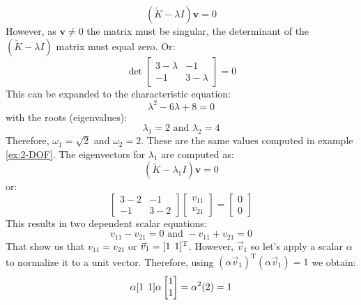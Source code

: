\documentclass[12pt,letter]{article}
\begin{document}
\begin{example}
	\begin{equation}
	(\widetilde{K} - \lambda I)\textbf{v} =  0
	\end{equation}
	However, as $\textbf{v} \neq 0$ the matrix must be singular, the determinant of the $(\widetilde{K} - \lambda I)$ matrix must equal zero. Or:
	\begin{equation}
	\det \begin{bmatrix} 3-\lambda & -1 \\    -1  & 3-\lambda \end{bmatrix}  =  0
	\end{equation}
	This can be expanded to the characteristic equation:
	\begin{equation}
	\lambda^2 -6\lambda + 8  =  0
	\end{equation}
	with the roots (eigenvalues):
	\begin{equation}
	\lambda_1 = 2\text{ and } \lambda_2 = 4
	\end{equation}
	Therefore, $\omega_1=\sqrt{2}$ and $\omega_2=2$. These are the same values computed in example \ref{ex:2-DOF}. The eigenvectors for $\lambda_1$ are computed as:
	\begin{equation}
	(\widetilde{K} - \lambda_1 I)\textbf{v} =  0
	\end{equation}
	or:
	\begin{equation}
	\begin{bmatrix} 3-2 & -1 \\    -1  & 3-2 \end{bmatrix} \begin{bmatrix} v_{11} \\ v_{21}  \end{bmatrix} =  \begin{bmatrix} 0 \\ 0  \end{bmatrix}
	\end{equation}
	This results in two dependent scalar equations:
	\begin{equation}
	v_{11} - v_{21} = 0 \text{ and } -v_{11} + v_{21} =0
	\end{equation}
	That show us that $v_{11} = v_{21}$ or $\vec{v}_1=[1 \hspace{1ex} 1]^\text{T}$. However, $\vec{v}_1$ so let's apply a scalar $\alpha$ to normalize it to a unit vector. Therefore, using $(\alpha \vec{v}_1)^\text{T}(\alpha \vec{v}_1) = 1$ we obtain:
	\begin{equation}
	\alpha [1 \hspace{1ex} 1]\alpha  \begin{bmatrix} 1 \\  1 \end{bmatrix}  = \alpha^2(2) = 1

\end{equation}
\end{example}
\end{document}

